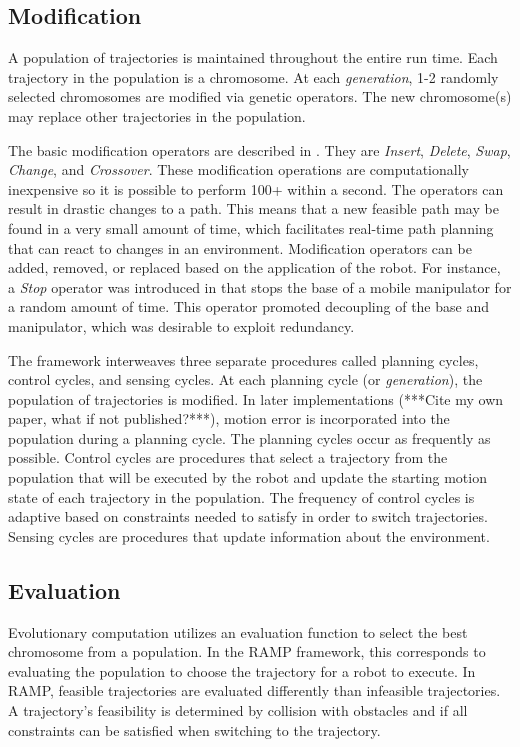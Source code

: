 \documentclass[10pt,conference]{ieeeconf}
\begin{document}
\subsection{Modification}

A population of trajectories is maintained throughout the entire run time. Each trajectory in the population is a chromosome. At each \emph{generation}, 1-2 randomly selected chromosomes are modified via genetic operators. The new chromosome(s) may replace other trajectories in the population. 

The basic modification operators are described in \cite{EPN_Adaptive}. They are \emph{Insert}, \emph{Delete}, \emph{Swap}, \emph{Change}, and \emph{Crossover}. These modification operations are computationally inexpensive so it is possible to perform 100+ within a second. The operators can result in drastic changes to a path. This means that a new feasible path may be found in a very small amount of time, which facilitates real-time path planning that can react to changes in an environment. Modification operators can be added, removed, or replaced based on the application of the robot. For instance, a \emph{Stop} operator was introduced in \cite{RAMP} that stops the base of a mobile manipulator for a random amount of time. This operator promoted decoupling of the base and manipulator, which was desirable to exploit redundancy. 

The framework interweaves three separate procedures called planning cycles, control cycles, and sensing cycles. At each planning cycle (or \emph{generation}), the population of trajectories is modified. In later implementations (***Cite my own paper, what if not published?***), motion error is incorporated into the population during a planning cycle. The planning cycles occur as frequently as possible. Control cycles are procedures that select a trajectory from the population that will be executed by the robot and update the starting motion state of each trajectory in the population. The frequency of control cycles is adaptive based on constraints needed to satisfy in order to switch trajectories. Sensing cycles are procedures that update information about the environment.

\subsection{Evaluation}

Evolutionary computation utilizes an evaluation function to select the best chromosome from a population. In the RAMP framework, this corresponds to evaluating the population to choose the trajectory for a robot to execute. In RAMP, feasible trajectories are evaluated differently than infeasible trajectories. A trajectory's feasibility is determined by collision with obstacles and if all constraints can be satisfied when switching to the trajectory.
\end{document}
